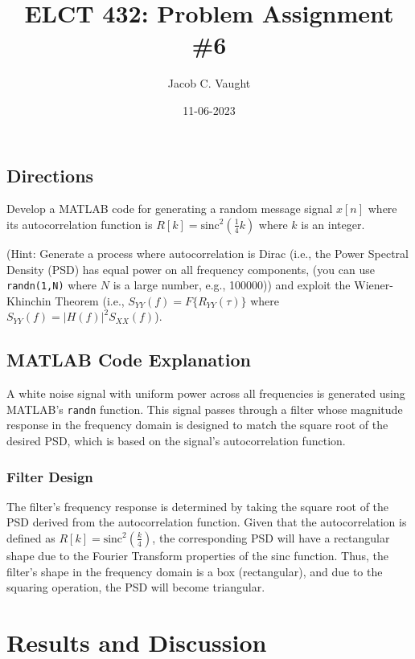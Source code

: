 \documentclass[12pt]{article}
\begin{document}
\title{ELCT 432: Problem Assignment \#6}
\author{Jacob C. Vaught}
\date{11-06-2023}
\maketitle

\subsection*{Directions}
Develop a MATLAB code for generating a random message signal \( x[n] \) where its autocorrelation function is \( R[k] = \text{sinc}^2\left(\frac{1}{4} k\right) \) where \( k \) is an integer. 

\noindent (Hint: Generate a process where autocorrelation is Dirac (i.e., the Power Spectral Density (PSD) has equal power on all frequency components, (you can use \texttt{randn(1,N)} where \( N \) is a large number, e.g., 100000)) and exploit the Wiener-Khinchin Theorem (i.e., \( S_{YY}(f) = F\{R_{YY}(\tau)\} \) where \( S_{YY}(f) = |H(f)|^2 S_{XX}(f) \)).

\subsection*{MATLAB Code Explanation}
A white noise signal with uniform power across all frequencies is generated using MATLAB's \texttt{randn} function. This signal passes through a filter whose magnitude response in the frequency domain is designed to match the square root of the desired PSD, which is based on the signal's autocorrelation function.

\subsubsection*{Filter Design}
The filter's frequency response is determined by taking the square root of the PSD derived from the autocorrelation function. Given that the autocorrelation is defined as \( R[k] = \text{sinc}^2\left(\frac{k}{4}\right) \), the corresponding PSD will have a rectangular shape due to the Fourier Transform properties of the sinc function. Thus, the filter's shape in the frequency domain is a box (rectangular), and due to the squaring operation, the PSD will become triangular.

\newpage
\section*{Results and Discussion}
\end{document}
